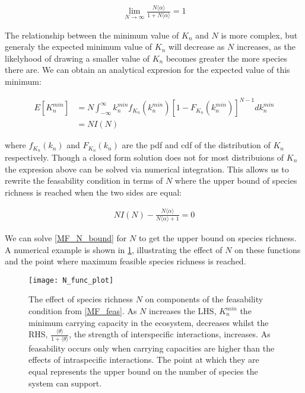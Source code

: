 \documentclass{article}
\begin{document}
\begin{align}
  \lim_{N \to \infty } \frac{N \langle \alpha \rangle}{1 + N \langle \alpha \rangle} = 1
\end{align}

The relationship between the minimum value of $K_n$ and $N$ is more complex, but generaly the expected minimum value of $K_n$ will decrease as $N$ increases, as the likelyhood of drawing a smaller value of $K_n$ becomes greater the more species there are. We can obtain an analytical expresion for the expected value of this minimum:

\begin{align}
  E[K_n^{min}] &= N \int_{-\infty}^{\infty} k_n^{min} f_{K_n}(k_n^{min}) \left[1 -  F_{K_n}(k_n^{min}) \right]^{N-1} dk_n^{min}
\\
               &= N I(N)
\end{align}

where $f_{K_n}(k_n)$ and $F_{K_n}(k_n)$ are the pdf and cdf of the distribution of $K_n$ respectively. Though a closed form solution does not for most distribuions of $K_n$ the expresion above can be solved via numerical integration. This allows us to rewrite the feasability condition in terms of $N$ where the upper bound of species richness is reached when the two sides are equal:

\begin{align}
  N I(N) - \frac{N \langle \alpha \rangle}{N \langle \alpha \rangle + 1} = 0 \label{MF_N_bound}
\end{align}

We can solve \cref{MF_N_bound} for $N$ to get the upper bound on species richness. A numerical example is shown in \cref{N_func_plot}, illustrating the effect of $N$ on these functions and the point where maximum feasible species richness is reached.

\begin{figure}
  \texttt{[image: N\_func\_plot]}
  \centering
  \caption{The effect of species richness $N$ on components of the feasability condition from \cref{MF_feas}. As $N$ increases the LHS, $K_n^{min}$ the minimum carrying capacity in the ecosystem, decreases whilst the RHS, $\frac{\langle \theta \rangle}{1 + \langle \theta \rangle}$, the strength of interspecific interactions, increases. As feasability occurs only when carrying capacities are higher than the effects of intraspecific interactions. The point at which they are equal represents the upper bound on the number of species the system can support.}
  \label{N_func_plot}
\end{figure}
\end{document}
